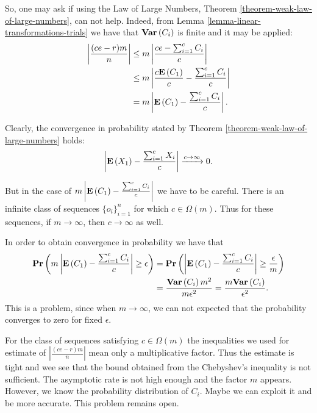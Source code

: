 So, one may ask if using the Law of Large Numbers, Theorem \ref{theorem-weak-law-of-large-numbers}, can not help. Indeed, from Lemma \ref{lemma-linear-transformations-trials} we have that $\mathbf{Var}\left(C_i\right)$ is finite and it may be applied:
\[
\begin{split}
\left|\frac{(ce - r)m}{n}\right|
	& \leq m \left|\frac{ce - \sum\displaylimits_{i = 1}^{c} C_i}{c}\right| \\
	& \leq m \left|\frac{c\mathbf{E}\left(C_1\right)}{c} - \frac{\sum\displaylimits_{i = 1}^{c} C_i}{c}\right| \\
	& = m \left|\mathbf{E}\left(C_1\right) - \frac{\sum\displaylimits_{i = 1}^{c} C_i}{c}\right| \text{.}
\end{split}
\]

Clearly, the convergence in probability stated by Theorem \ref{theorem-weak-law-of-large-numbers} holds:
\[
	\left|\mathbf{E}\left(X_1\right) - \frac{\sum\displaylimits_{i = 1}^{c} X_i}{c}\right| \xrightarrow{c \rightarrow \infty} 0 \text{.}
\]

But in the case of $m \left|\mathbf{E}\left(C_1\right) - \frac{\sum\displaylimits_{i = 1}^{c} C_i}{c}\right|$ we have to be careful. There is an infinite class of sequences $\{o_i\}_{i = 1}^{n}$ for which $c \in \Omega(m)$. Thus for these sequences, if $m \rightarrow \infty$, then $c \rightarrow \infty$ as well.

In order to obtain convergence in probability we have that
\[
\begin{split}
\mathbf{Pr}\left(m \left|\mathbf{E}\left(C_1\right) - \frac{\sum\displaylimits_{i = 1}^{c} C_i}{c}\right| \geq \epsilon\right) 
	& = \mathbf{Pr}\left(\left|\mathbf{E}\left(C_1\right) - \frac{\sum\displaylimits_{i = 1}^{c} C_i}{c}\right| \geq \frac{\epsilon}{m}\right)  \\
	& = \frac{\mathbf{Var}\left(C_i\right) m ^ 2}{m \epsilon ^ 2} = \frac{m\mathbf{Var}\left(C_i\right)}{\epsilon ^ 2} \text{.}
\end{split}
\]
This is a problem, since when $m \rightarrow \infty$, we can not expected that the probability converges to zero for fixed $\epsilon$. 

For the class of sequences satisfying $c \in \Omega(m)$ the inequalities we used for estimate of $\left|\frac{(ce - r)m}{n}\right|$ mean only a multiplicative factor. Thus the estimate is tight and wee see that the bound obtained from the Chebyshev's inequality is not sufficient. The asymptotic rate is not high enough and the factor $m$ appears. However, we know the probability distribution of $C_i$. Maybe we can exploit it and be more accurate. This problem remains open.
